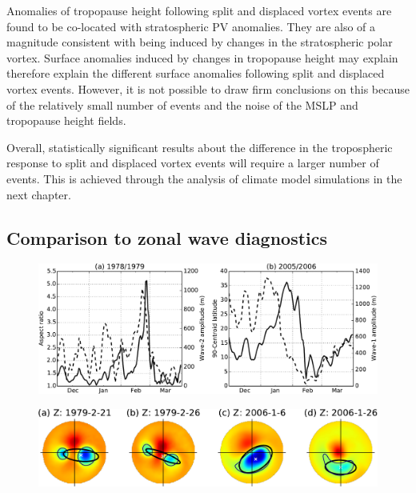 Anomalies of tropopause height following split and displaced vortex events are
found to be co-located with stratospheric PV anomalies. They are also of a
magnitude consistent with being induced by changes in the stratospheric polar
vortex. Surface anomalies induced by changes in tropopause height may explain
therefore explain the different surface anomalies following split and displaced
vortex events. However, it is not possible to draw firm conclusions on this
because of the relatively small number of events and the noise of the MSLP and
tropopause height fields.

Overall, statistically significant results about the difference in the
tropospheric response to split and displaced vortex events will require a larger
number of events. This is achieved through the analysis of climate model
simulations in the next chapter.  




\pagebreak

\begin{subappendices}
\section{Comparison to zonal wave diagnostics}


\begin{figure}
 \centering
 \noindent\includegraphics[width=\textwidth]{figures/chapter-moments/waves_moments_ts.pdf}
 \caption[]{}
 \label{fig:}
\end{figure}

\begin{figure}
 \centering
 \noindent\includegraphics[width=\textwidth]{figures/chapter-moments/wave_moment_vortices.pdf}
 \caption[]{}
 \label{fig:}
\end{figure}

\end{subappendices}










